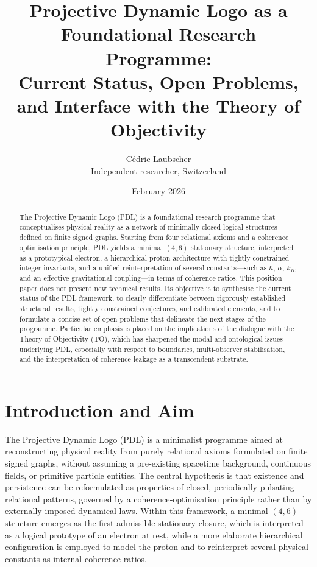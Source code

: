 \documentclass[11pt,a4paper]{article}
\title{%
Projective Dynamic Logo as a Foundational Research Programme:\\
Current Status, Open Problems, and Interface with the Theory of Objectivity
}
\author{C\'edric Laubscher\\
\small Independent researcher, Switzerland}
\date{February 2026}
\begin{document}
\maketitle

\begin{abstract}
The Projective Dynamic Logo (PDL) is a foundational research programme that conceptualises physical reality as a network of minimally closed logical structures defined on finite signed graphs.\cite{Laubscher2026IntroPDL,Laubscher2026FullPDL} Starting from four relational axioms and a coherence–optimisation principle, PDL yields a minimal $(4,6)$ stationary structure, interpreted as a prototypical electron, a hierarchical proton architecture with tightly constrained integer invariants, and a unified reinterpretation of several constants—such as $\hbar$, $\alpha$, $k_B$, and an effective gravitational coupling—in terms of coherence ratios.\cite{Laubscher2026FullPDL,Laubscher2026Alpha,Laubscher2026TopologicalReformulation} This position paper does not present new technical results. Its objective is to synthesise the current status of the PDL framework, to clearly differentiate between rigorously established structural results, tightly constrained conjectures, and calibrated elements, and to formulate a concise set of open problems that delineate the next stages of the programme. Particular emphasis is placed on the implications of the dialogue with the Theory of Objectivity (TO), which has sharpened the modal and ontological issues underlying PDL, especially with respect to boundaries, multi‑observer stabilisation, and the interpretation of coherence leakage as a transcendent substrate.\cite{Laubscher2026DialogueTO}
\end{abstract}

\section{Introduction and Aim}
The Projective Dynamic Logo (PDL) is a minimalist programme aimed at reconstructing physical reality from purely relational axioms formulated on finite signed graphs, without assuming a pre‑existing spacetime background, continuous fields, or primitive particle entities.\cite{Laubscher2026IntroPDL,Laubscher2026FullPDL} The central hypothesis is that existence and persistence can be reformulated as properties of closed, periodically pulsating relational patterns, governed by a coherence‑optimisation principle rather than by externally imposed dynamical laws.\cite{Laubscher2026FullPDL} Within this framework, a minimal $(4,6)$ structure emerges as the first admissible stationary closure, which is interpreted as a logical prototype of an electron at rest, while a more elaborate hierarchical configuration is employed to model the proton and to reinterpret several physical constants as internal coherence ratios.\cite{Laubscher2026IntroPDL,Laubscher2026Alpha}
\end{document}
